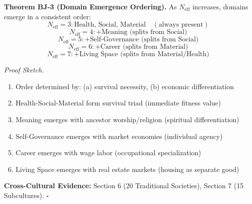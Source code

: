 \begin{tcolorbox}[colback=green!5!white, colframe=green!75!black, title=Theorem BJ-3: Domain Emergence Ordering]
\textbf{Theorem BJ-3 (Domain Emergence Ordering).}
As $N_{\text{eff}}$ increases, domains emerge in a consistent order:
\begin{equation}
N_{\text{eff}} = 3: \text{Health, Social, Material} \quad (\text{always present})
\end{equation}
\begin{equation}
N_{\text{eff}} = 4: + \text{Meaning (splits from Social)}
\end{equation}
\begin{equation}
N_{\text{eff}} = 5: + \text{Self-Governance (splits from Social)}
\end{equation}
\begin{equation}
N_{\text{eff}} = 6: + \text{Career (splits from Material)}
\end{equation}
\begin{equation}
N_{\text{eff}} = 7: + \text{Living Space (splits from Material/Health)}
\end{equation}

\textit{Proof Sketch.}
\begin{enumerate}[nosep]
\item Order determined by: (a) survival necessity, (b) economic differentiation
\item Health-Social-Material form survival triad (immediate fitness value)
\item Meaning emerges with ancestor worship/religion (spiritual differentiation)
\item Self-Governance emerges with market economies (individual agency)
\item Career emerges with wage labor (occupational specialization)
\item Living Space emerges with real estate markets (housing as separate good)
\end{enumerate}
\textbf{Cross-Cultural Evidence:} Section 6 (20 Traditional Societies), Section 7 (15 Subcultures). \hfill $\square$
\end{tcolorbox}

